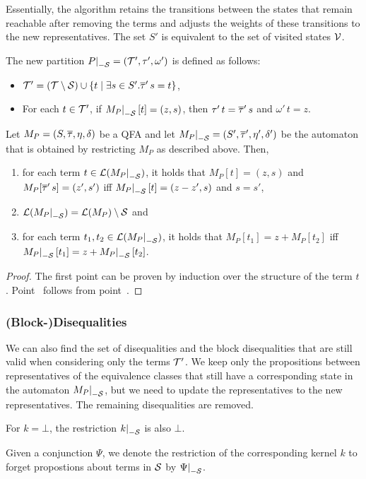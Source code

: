 Essentially, the algorithm retains the transitions between the states that remain reachable after removing the terms and adjusts the weights of these transitions to the new representatives.
The set $S'$ is equivalent to the set of visited states $\mathcal{V}$.

The new partition $\restr{P}{-\Set} = (\T', \tau', \omega')$ is defined as follows:
\begin{itemize}
    \item $\mathcal{T}' = (\mathcal{T} \setminus \mathcal{S}) \cup \{t \mid \exists s \in S' . \overline{\tau}'\,s = t\}$,
    \item For each $t \in \mathcal{T}'$, if $\restr{M_P}{-\Set}[t] = (z, s)$, then $\tau'\,t = \overline{\tau}'\,s$ and $\omega'\,t = z$.
\end{itemize}

\begin{theorem}\label{restriction}
    Let $M_P = (S, \overline{\tau}, \eta, \delta)$ be a QFA and let $\restr{M_P}{-\Set} = (S', \otau', \eta', \delta')$ be the automaton that is obtained by restricting $M_P$ as described above.
    Then,
    \begin{enumerate}
        \item\label{item:lemma-restriction} for each term $t \in \L(\restr{M_P}{-\Set})$, it holds that $M_P[t] = (z, s)$ and $M_P[\overline{\tau}'\,s] = (z', s')$ iff $\restr{M_P}{-\Set}[t] = (z - z', s)$ and $s = s'$,
        \item $\L(\restr{M_P}{-\Set}) = \L(M_P) \setminus \Set$ and
              \item\label{item:correctness-restriction} for each term $t_1, t_2 \in \L(\restr{M_P}{-\Set})$, it holds that $M_P[t_1] = z + M_P[t_2]$ iff $\restr{M_P}{-\Set}[t_1] = z + \restr{M_P}{-\Set}[t_2]$.
    \end{enumerate}
\end{theorem}
\begin{proof}
    The first point can be proven by induction over the structure of the term $t$.
    Point~ follows from point~.
\end{proof}
\subsubsection{(Block-)Disequalities}
We can also find the set of disequalities and the block disequalities that are still valid when considering only the terms $\mathcal{T}'$.
We keep only the propositions between representatives of the equivalence classes that
still have a corresponding state in the automaton $\restr{M_P}{-\Set}$, but we need to update the representatives to the new representatives.
The remaining disequalities are removed.

For $k = \bot$, the restriction $\restr{k}{-\Set}$ is also $\bot$.

Given a conjunction $\Psi$, we denote the restriction of the corresponding kernel $k$ to forget propostions about terms in $\mathcal{S}$ by $\restr{\Psi}{-\Set}$.
